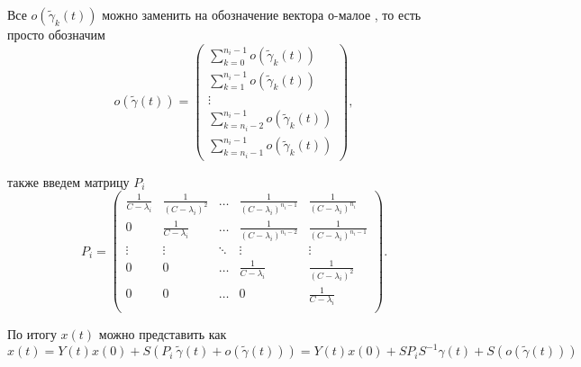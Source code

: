 \documentclass[12pt, a4paper]{article}
\begin{document}
\quad Все $o(\widetilde{\gamma}_k(t))$ можно заменить на обозначение вектора о-малое , то есть просто обозначим 
\[o(\widetilde{\gamma}(t)) = 
\left(
\begin{array}{c}
\displaystyle \sum_{k=0}^{n_i - 1}o(\widetilde{\gamma}_k(t)) \\
\displaystyle \sum_{k=1}^{n_i - 1}o(\widetilde{\gamma}_k(t)) \\
\vdots \\
\displaystyle \sum_{k=n_i-2}^{n_i - 1}o(\widetilde{\gamma}_k(t)) \\
\displaystyle \sum_{k=n_i-1}^{n_i - 1}o(\widetilde{\gamma}_k(t))
\end{array}
\right),
\]

также введем матрицу $P_i$
\[ P_i = \left(
\begin{array}{ccccc}
\displaystyle\frac{1}{C-\lambda_i} & \displaystyle\frac{1}{(C-\lambda_i)^2} & \dots & \displaystyle\frac{1}{(C-\lambda_i)^{n_i-1}} & \displaystyle\frac{1}{(C-\lambda_i)^{n_i}} \\
0 & \displaystyle\frac{1}{C-\lambda_i} & \dots & \displaystyle\frac{1}{(C-\lambda_i)^{n_i-2}} & \displaystyle\frac{1}{(C-\lambda_i)^{n_i-1}} \\
\vdots & \vdots & \ddots & \vdots & \vdots\\
0 & 0 & \dots & \displaystyle\frac{1}{C-\lambda_i} & \displaystyle\frac{1}{(C-\lambda_i)^2} \\
0 & 0 & \dots & 0 & \displaystyle\frac{1}{C-\lambda_i} \\
\end{array}
\right).
\]
\newpage

\quad По итогу $x(t)$ можно представить как
\[
x(t) = Y(t)x(0) + S\left(P_i \: \widetilde{\gamma}(t) + o(\widetilde{\gamma}(t))\right) = Y(t)x(0) + S P_i S^{-1} \gamma(t) + S \left( o(\widetilde{\gamma}(t))\right)
\]





\begin{comment}
\quad Пусть система $(1)$ асимптотически устойчива по Ляпунову, из чего следует, что $\forall \: \lambda_{i}, \; i=\overline{1, n}$ - собственного числа матрицы $A$, выполняется $Re(\lambda_{i}) < 0$.
\end{comment} 
\end{document}
